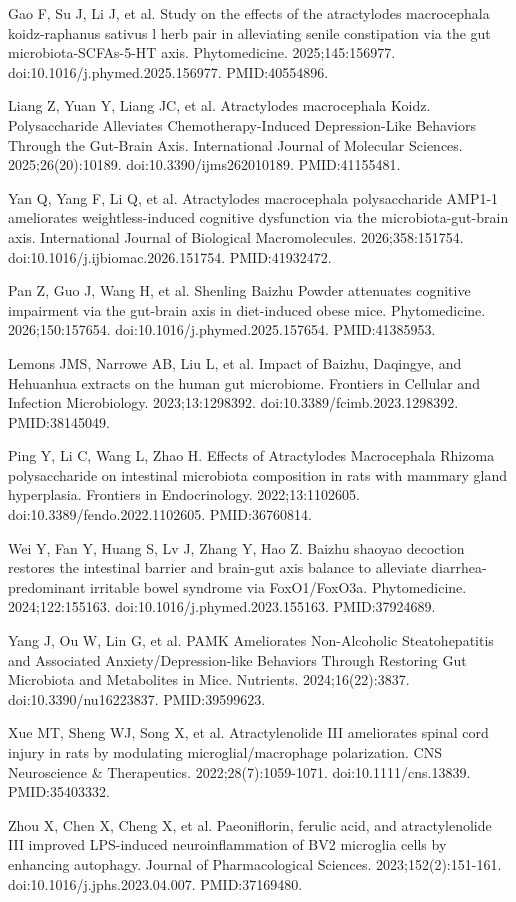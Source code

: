\documentclass[11pt,oneside]{book}
\newcommand{\reff}[2]{\par\hangindent=7mm\hangafter=1\noindent[#1]\hspace{2mm}#2\par}
\begin{document}
\reff{21}{Gao F, Su J, Li J, et al. Study on the effects of the atractylodes macrocephala koidz-raphanus sativus l herb pair in alleviating senile constipation via the gut microbiota-SCFAs-5-HT axis. Phytomedicine. 2025;145:156977. doi:10.1016/j.phymed.2025.156977. PMID:40554896.}
\reff{22}{Liang Z, Yuan Y, Liang JC, et al. Atractylodes macrocephala Koidz. Polysaccharide Alleviates Chemotherapy-Induced Depression-Like Behaviors Through the Gut-Brain Axis. International Journal of Molecular Sciences. 2025;26(20):10189. doi:10.3390/ijms262010189. PMID:41155481.}
\reff{23}{Yan Q, Yang F, Li Q, et al. Atractylodes macrocephala polysaccharide AMP1-1 ameliorates weightless-induced cognitive dysfunction via the microbiota-gut-brain axis. International Journal of Biological Macromolecules. 2026;358:151754. doi:10.1016/j.ijbiomac.2026.151754. PMID:41932472.}
\reff{24}{Pan Z, Guo J, Wang H, et al. Shenling Baizhu Powder attenuates cognitive impairment via the gut-brain axis in diet-induced obese mice. Phytomedicine. 2026;150:157654. doi:10.1016/j.phymed.2025.157654. PMID:41385953.}
\reff{25}{Lemons JMS, Narrowe AB, Liu L, et al. Impact of Baizhu, Daqingye, and Hehuanhua extracts on the human gut microbiome. Frontiers in Cellular and Infection Microbiology. 2023;13:1298392. doi:10.3389/fcimb.2023.1298392. PMID:38145049.}
\reff{26}{Ping Y, Li C, Wang L, Zhao H. Effects of Atractylodes Macrocephala Rhizoma polysaccharide on intestinal microbiota composition in rats with mammary gland hyperplasia. Frontiers in Endocrinology. 2022;13:1102605. doi:10.3389/fendo.2022.1102605. PMID:36760814.}
\reff{27}{Wei Y, Fan Y, Huang S, Lv J, Zhang Y, Hao Z. Baizhu shaoyao decoction restores the intestinal barrier and brain-gut axis balance to alleviate diarrhea-predominant irritable bowel syndrome via FoxO1/FoxO3a. Phytomedicine. 2024;122:155163. doi:10.1016/j.phymed.2023.155163. PMID:37924689.}
\reff{28}{Yang J, Ou W, Lin G, et al. PAMK Ameliorates Non-Alcoholic Steatohepatitis and Associated Anxiety/Depression-like Behaviors Through Restoring Gut Microbiota and Metabolites in Mice. Nutrients. 2024;16(22):3837. doi:10.3390/nu16223837. PMID:39599623.}
\reff{29}{Xue MT, Sheng WJ, Song X, et al. Atractylenolide III ameliorates spinal cord injury in rats by modulating microglial/macrophage polarization. CNS Neuroscience \& Therapeutics. 2022;28(7):1059-1071. doi:10.1111/cns.13839. PMID:35403332.}
\reff{30}{Zhou X, Chen X, Cheng X, et al. Paeoniflorin, ferulic acid, and atractylenolide III improved LPS-induced neuroinflammation of BV2 microglia cells by enhancing autophagy. Journal of Pharmacological Sciences. 2023;152(2):151-161. doi:10.1016/j.jphs.2023.04.007. PMID:37169480.}
\end{document}
